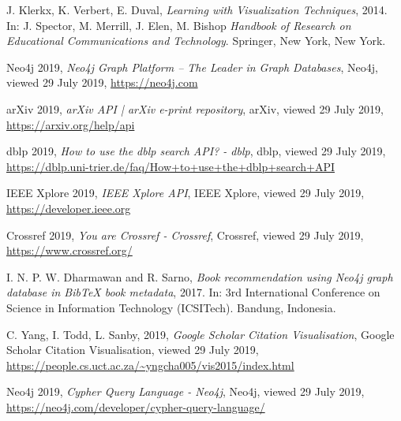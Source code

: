 \documentclass[twocolumn]{article}
\begin{document}
\begin{thebibliography}{9}

J. Klerkx, K. Verbert, E. Duval,
\textit{Learning with Visualization Techniques}, 2014.
In: J. Spector, M. Merrill, J. Elen, M. Bishop 
\textit{Handbook of Research on Educational Communications and Technology}. 
Springer, New York, New York.

Neo4j 2019, 
\textit{Neo4j Graph Platform – The Leader in Graph Databases}, 
Neo4j, viewed 29 July 2019, 
\url{https://neo4j.com}

arXiv 2019,
\textit{arXiv API | arXiv e-print repository},
arXiv, viewed 29 July 2019,
\url{https://arxiv.org/help/api}

dblp 2019,
\textit{How to use the dblp search API? - dblp},
dblp, viewed 29 July 2019,
\url{https://dblp.uni-trier.de/faq/How+to+use+the+dblp+search+API}

IEEE Xplore 2019,
\textit{IEEE Xplore API},
IEEE Xplore, viewed 29 July 2019,
\url{https://developer.ieee.org}

Crossref 2019,
\textit{You are Crossref - Crossref},
Crossref, viewed 29 July 2019,
\url{https://www.crossref.org/}

I. N. P. W. Dharmawan and R. Sarno, 
\textit{Book recommendation using Neo4j graph database in BibTeX book metadata}, 2017.
In: 3rd International Conference on Science in Information Technology (ICSITech). 
Bandung, Indonesia.

C. Yang, I. Todd, L. Sanby, 2019,
\textit{Google Scholar Citation Visualisation},
Google Scholar Citation Visualisation, viewed 29 July 2019,
\url{https://people.cs.uct.ac.za/~yngcha005/vis2015/index.html}

Neo4j 2019,
\textit{Cypher Query Language - Neo4j},
Neo4j, viewed 29 July 2019,
\url{https://neo4j.com/developer/cypher-query-language/}

\end{thebibliography}
\end{document}
